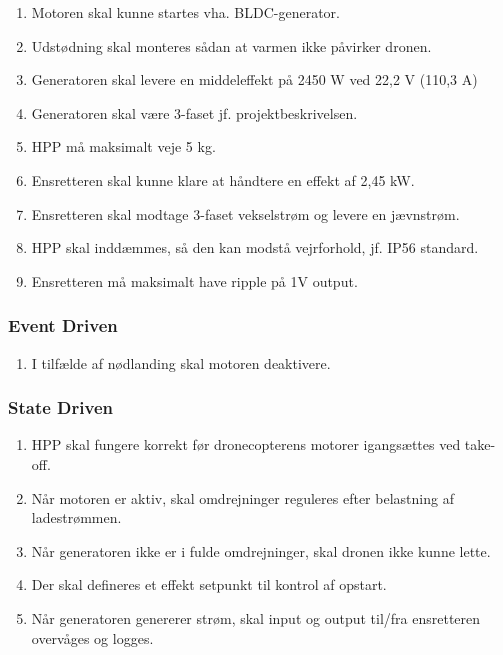 \begin{enumerate}[label=2.1.1.\arabic*]
\item Motoren skal kunne startes vha. BLDC-generator.
\item Udstødning skal monteres sådan at varmen ikke påvirker dronen.
\item Generatoren skal levere en middeleffekt på 2450 W ved 22,2 V (110,3 A)
\item Generatoren skal være 3-faset jf. projektbeskrivelsen.
\item HPP må maksimalt veje 5 kg.
\item Ensretteren skal kunne klare at håndtere en effekt af 2,45 kW.
\item Ensretteren skal modtage 3-faset vekselstrøm og levere en jævnstrøm.
\item HPP skal inddæmmes, så den kan modstå vejrforhold, jf. IP56 standard.
\item Ensretteren må maksimalt have ripple på 1V output.
\end{enumerate}

\subsubsection{Event Driven}
\label{sec:kravspecifikation-2}

\begin{enumerate}[label=2.1.2.\arabic*]
\item I tilfælde af nødlanding skal motoren deaktivere. 
\end{enumerate}

\subsubsection{State Driven}
\label{sec:kravspecifikation-3}

\begin{enumerate}[label=2.1.3.\arabic*]
\item HPP skal fungere korrekt før dronecopterens motorer igangsættes ved take-off.
\item Når motoren er aktiv, skal omdrejninger reguleres efter belastning af ladestrømmen.
\item Når generatoren ikke er i fulde omdrejninger, skal dronen ikke kunne lette.
\item Der skal defineres et effekt setpunkt til kontrol af opstart.
\item Når generatoren genererer strøm, skal input og output til/fra ensretteren overvåges og logges.
\end{enumerate}

